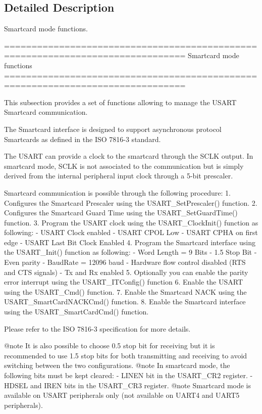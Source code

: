 \subsection{Detailed Description}
Smartcard mode functions. \begin{DoxyVerb} ===============================================================================
                               Smartcard mode functions
 ===============================================================================  

  This subsection provides a set of functions allowing to manage the USART 
  Smartcard communication.
  
  The Smartcard interface is designed to support asynchronous protocol Smartcards as
  defined in the ISO 7816-3 standard.

  The USART can provide a clock to the smartcard through the SCLK output.
  In smartcard mode, SCLK is not associated to the communication but is simply derived 
  from the internal peripheral input clock through a 5-bit prescaler.

  Smartcard communication is possible through the following procedure:
     1. Configures the Smartcard Prescaler using the USART_SetPrescaler() function.
     2. Configures the Smartcard Guard Time using the USART_SetGuardTime() function.
     3. Program the USART clock using the USART_ClockInit() function as following:
        - USART Clock enabled
        - USART CPOL Low
        - USART CPHA on first edge
        - USART Last Bit Clock Enabled
     4. Program the Smartcard interface using the USART_Init() function as following:
        - Word Length = 9 Bits
        - 1.5 Stop Bit
        - Even parity
        - BaudRate = 12096 baud
        - Hardware flow control disabled (RTS and CTS signals)
        - Tx and Rx enabled
     5. Optionally you can enable the parity error interrupt using the USART_ITConfig()
        function
     6. Enable the USART using the USART_Cmd() function.
     7. Enable the Smartcard NACK using the USART_SmartCardNACKCmd() function.
     8. Enable the Smartcard interface using the USART_SmartCardCmd() function.

  Please refer to the ISO 7816-3 specification for more details.


@note It is also possible to choose 0.5 stop bit for receiving but it is recommended 
      to use 1.5 stop bits for both transmitting and receiving to avoid switching 
      between the two configurations.
@note In smartcard mode, the following bits must be kept cleared:
        - LINEN bit in the USART_CR2 register.
        - HDSEL and IREN bits in the USART_CR3 register.
@note Smartcard mode is available on USART peripherals only (not available on UART4 
      and UART5 peripherals).\end{DoxyVerb}
 

